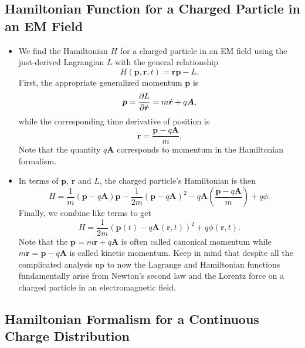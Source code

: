 \documentclass[11pt, a4paper]{article}
\renewcommand{\vec}[1]{\bm{#1}} %
\renewcommand{\r}{\vec{r}}
\newcommand{\A}{\vec{A}} %
\begin{document}
\subsection{Hamiltonian Function for a Charged Particle in an EM Field}
\begin{itemize}
    \item We find the Hamiltonian $ H $ for a charged particle in an EM field using the just-derived Lagrangian $ L $ with the general relationship
    \begin{equation*}
        H( \vec{p}, \vec{r}, t) = \dot{\vec{r}} \dot{\vec{p}} - L.
    \end{equation*}
    First, the appropriate generalized momentum $ \vec{p} $ is
    \begin{equation*}
        \vec{p} = \pdv{L}{ \dot{\vec{r}}} = m \dot{\vec{r}} + q \A,
    \end{equation*}
    while the corresponding time derivative of position is
    \begin{equation*}
        \dot{\vec{r}} = \frac{\vec{p} - q\A}{m}.
    \end{equation*}
    Note that the quantity $ q \A $ corresponds to momentum in the Hamiltonian formalism. 

    \item In terms of $ \vec{p} $, $ \dot{\vec{r}} $ and $ L $, the charged particle's Hamiltonian is then
    \begin{equation*}
        H = \frac{1}{m} ( \vec{p} - q\A) \vec{p} - \frac{1}{2m} ( \vec{p} - q\A)^{2} - q\A \left( \frac{ \vec{p} - q \A}{m} \right) + q \phi.
    \end{equation*}
    Finally, we combine like terms to get
    \begin{equation*}
        H = \frac{1}{2m}( \vec{p}(t) - q\A (\r, t))^{2} + q \phi(\r, t).
    \end{equation*}
    Note that the $ \vec{p} = m \dot{\vec{r}} + q \A $ is often called canonical momentum while $ m \dot{\vec{r}} = \vec{p} - q\A $ is called kinetic momentum. Keep in mind that despite all the complicated analysis up to now the Lagrange and Hamiltonian functions fundamentally arise from Newton's second law and the Lorentz force on a charged particle in an electromagnetic field.
    
\end{itemize}


\subsection{Hamiltonian Formalism for a Continuous Charge Distribution}
\end{document}
